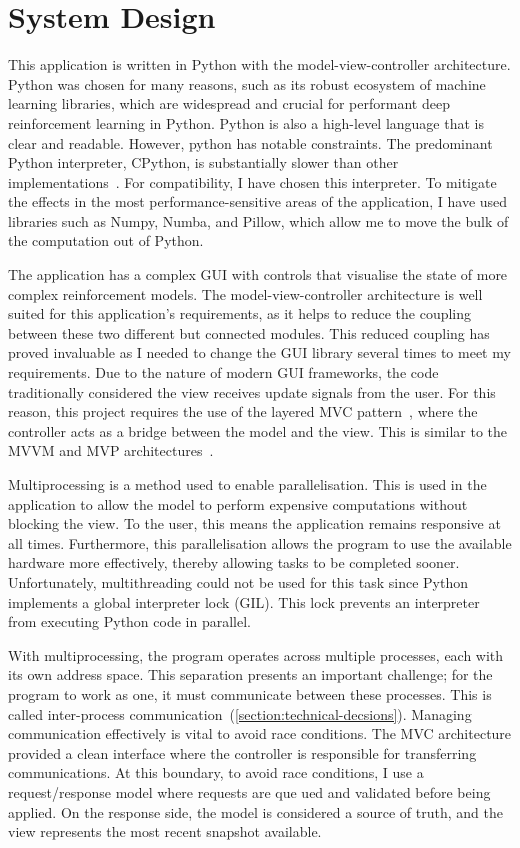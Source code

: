 \documentclass[]{final_report}
\begin{document}
\section{System Design}\label{section:system-design}

This application is written in Python with the model-view-controller architecture. Python was chosen for many reasons, such as its robust ecosystem of machine learning libraries, which are widespread and crucial for performant deep reinforcement learning in Python. Python is also a high-level language that is clear and readable. However, python has notable constraints. The predominant Python interpreter, CPython, is substantially slower than other implementations~\cite{pythonMachineLearning}. For compatibility, I have chosen this interpreter. To mitigate the effects in the most performance-sensitive areas of the application, I have used libraries such as Numpy, Numba, and Pillow, which allow me to move the bulk of the computation out of Python.  

The application has a complex GUI with controls that visualise the state of more complex reinforcement models. The model-view-controller architecture is well suited for this application's requirements, as it helps to reduce the coupling between these two different but connected modules. This reduced coupling has proved invaluable as I needed to change the GUI library several times to meet my requirements. Due to the nature of modern GUI frameworks, the code traditionally considered the view receives update signals from the user. For this reason, this project requires the use of the layered MVC pattern~\cite{webMVC,gamesMVC}, where the controller acts as a bridge between the model and the view. This is similar to the MVVM and MVP architectures~\cite{mvvm}.

Multiprocessing is a method used to enable parallelisation. This is used in the application to allow the model to perform expensive computations without blocking the view. To the user, this means the application remains responsive at all times. Furthermore, this parallelisation allows the program to use the available hardware more effectively, thereby allowing tasks to be completed sooner. Unfortunately, multithreading could not be used for this task since Python implements a global interpreter lock (GIL). This lock prevents an interpreter from executing Python code in parallel. 

With multiprocessing, the program operates across multiple processes, each with its own address space. This separation presents an important challenge; for the program to work as one, it must communicate between these processes. This is called inter-process communication~(\ref{section:technical-decsions}). Managing communication effectively is vital to avoid race conditions. The MVC architecture provided a clean interface where the controller is responsible for transferring communications. At this boundary, to avoid race conditions, I use a request/response model where requests are que  ued and validated before being applied. On the response side, the model is considered a source of truth, and the view represents the most recent snapshot available.  
\end{document}
